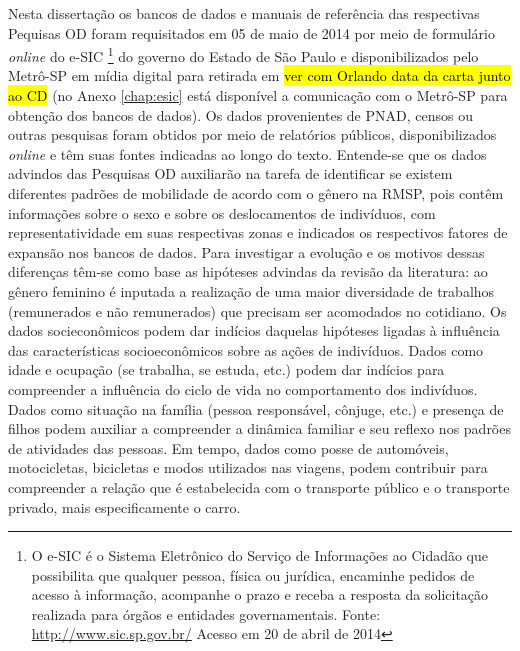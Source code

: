Nesta dissertação os bancos de dados e manuais de referência das respectivas Pequisas OD foram requisitados em 05 de maio de 2014 por meio de formulário \emph{online} do e-SIC
\footnote{O e-SIC é o Sistema Eletrônico do Serviço de Informações ao Cidadão que possibilita que qualquer pessoa, física ou jurídica, encaminhe pedidos de acesso à informação, acompanhe o prazo e receba a resposta da solicitação realizada para órgãos e entidades governamentais. Fonte: \url{http://www.sic.sp.gov.br/} Acesso em 20 de abril de 2014} do governo do Estado de São Paulo e disponibilizados pelo Metrô-SP em mídia digital para retirada em \hl{ver com Orlando data da carta junto ao CD} (no Anexo \ref{chap:esic} está disponível a comunicação com o Metrô-SP para obtenção dos bancos de dados). Os dados provenientes de PNAD, censos ou outras pesquisas foram obtidos por meio de relatórios públicos, disponibilizados \emph{online} e têm suas fontes indicadas ao longo do texto. Entende-se que os dados advindos das Pesquisas OD auxiliarão na tarefa de identificar se existem diferentes padrões de mobilidade de acordo com o gênero na RMSP, pois contêm informações sobre o sexo e sobre os deslocamentos de indivíduos, com representatividade em suas respectivas zonas e indicados os respectivos fatores de expansão nos bancos de dados. Para investigar a evolução e os motivos dessas diferenças têm-se como base as hipóteses advindas da revisão da literatura: ao gênero feminino é inputada a realização de uma maior diversidade de trabalhos (remunerados e não remunerados) que precisam ser acomodados no cotidiano. Os dados socieconômicos podem dar indícios daquelas hipóteses ligadas à influência das características socioeconômicos sobre as ações de indivíduos. Dados como idade e ocupação (se trabalha, se estuda, etc.) podem dar indícios para compreender a influência do ciclo de vida no comportamento dos indivíduos. Dados como situação na família (pessoa responsável, cônjuge, etc.) e presença de filhos podem auxiliar a compreender a dinâmica familiar e seu reflexo nos padrões de atividades das pessoas. Em tempo, dados como posse de automóveis, motocicletas, bicicletas e modos utilizados nas viagens, podem contribuir para compreender a relação que é estabelecida com o transporte público e o transporte privado, mais especificamente o carro. 

